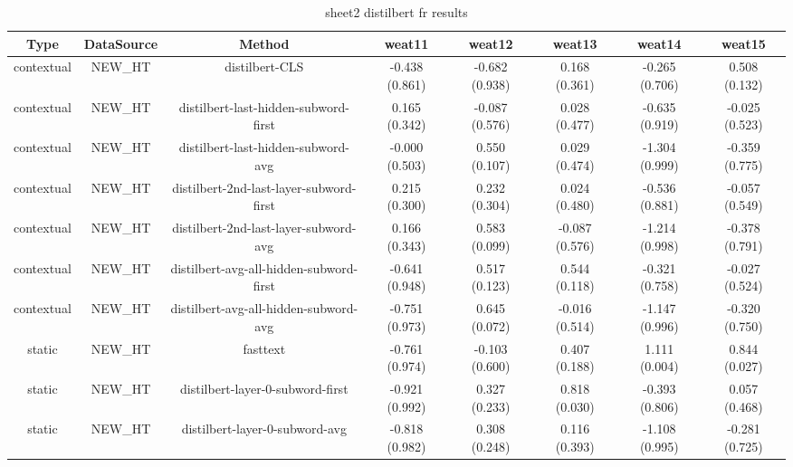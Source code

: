 \begin{sidewaystable}[htb]
    \centering
    \caption{sheet2 distilbert fr results}
    \label{appendix_tab:sheet2_distilbert_fr_results}
    \small
    \begin{tabular}{@{}cccccccc@{}}
        \toprule
        Type & DataSource & Method & weat11 & weat12 & weat13 & weat14 & weat15 \\
        \midrule
        contextual & NEW\_HT & distilbert-CLS & -0.438 (0.861) & -0.682 (0.938) & 0.168 (0.361) & -0.265 (0.706) & 0.508 (0.132) \\
        contextual & NEW\_HT & distilbert-last-hidden-subword-first & 0.165 (0.342) & -0.087 (0.576) & 0.028 (0.477) & -0.635 (0.919) & -0.025 (0.523) \\
        contextual & NEW\_HT & distilbert-last-hidden-subword-avg & -0.000 (0.503) & 0.550 (0.107) & 0.029 (0.474) & -1.304 (0.999) & -0.359 (0.775) \\
        contextual & NEW\_HT & distilbert-2nd-last-layer-subword-first & 0.215 (0.300) & 0.232 (0.304) & 0.024 (0.480) & -0.536 (0.881) & -0.057 (0.549) \\
        contextual & NEW\_HT & distilbert-2nd-last-layer-subword-avg & 0.166 (0.343) & 0.583 (0.099) & -0.087 (0.576) & -1.214 (0.998) & -0.378 (0.791) \\
        contextual & NEW\_HT & distilbert-avg-all-hidden-subword-first & -0.641 (0.948) & 0.517 (0.123) & 0.544 (0.118) & -0.321 (0.758) & -0.027 (0.524) \\
        contextual & NEW\_HT & distilbert-avg-all-hidden-subword-avg & -0.751 (0.973) & 0.645 (0.072) & -0.016 (0.514) & -1.147 (0.996) & -0.320 (0.750) \\
        static & NEW\_HT & fasttext & -0.761 (0.974) & -0.103 (0.600) & 0.407 (0.188) & 1.111 (0.004) & 0.844 (0.027) \\
        static & NEW\_HT & distilbert-layer-0-subword-first & -0.921 (0.992) & 0.327 (0.233) & 0.818 (0.030) & -0.393 (0.806) & 0.057 (0.468) \\
        static & NEW\_HT & distilbert-layer-0-subword-avg & -0.818 (0.982) & 0.308 (0.248) & 0.116 (0.393) & -1.108 (0.995) & -0.281 (0.725) \\
        \bottomrule
    \end{tabular}
\end{sidewaystable}